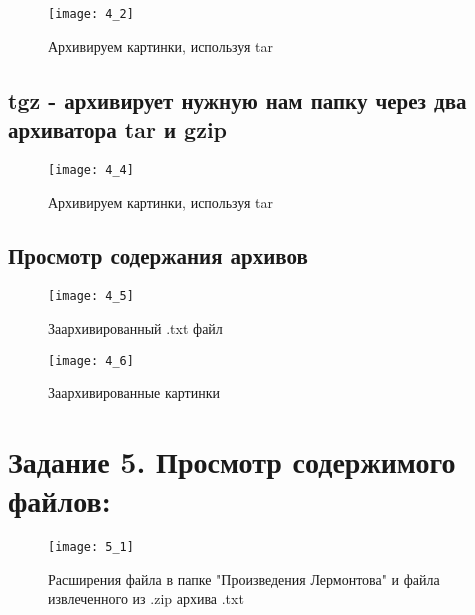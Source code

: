 \begin{figure}[H]
	\begin{center}
		\texttt{[image: 4\_2]}
		\caption{Архивируем картинки, используя tar} 
		\label{pic:pic_1} %
	\end{center}
\end{figure}

\subsection{tgz - архивирует нужную нам папку через два архиватора tar и gzip}

\begin{figure}[H]
	\begin{center}
		\texttt{[image: 4\_4]}
		\caption{Архивируем картинки, используя tar} 
		\label{pic:pic_1} %
	\end{center}
\end{figure}

\subsection{Просмотр содержания архивов}

\begin{figure}[H]
	\begin{center}
		\texttt{[image: 4\_5]}
		\caption{Заархивированный .txt файл} 
		\label{pic:pic_1} %
	\end{center}
\end{figure}

\begin{figure}[H]
	\begin{center}
		\texttt{[image: 4\_6]}
		\caption{Заархивированные картинки} 
		\label{pic:pic_1} %
	\end{center}
\end{figure}

\section{Задание 5. Просмотр содержимого файлов:}

\begin{figure}[H]
	\begin{center}
		\texttt{[image: 5\_1]}
		\caption{Расширения файла в папке "Произведения Лермонтова" и файла извлеченного из .zip архива .txt} 
		\label{pic:pic_1} %
	\end{center}
\end{figure}

